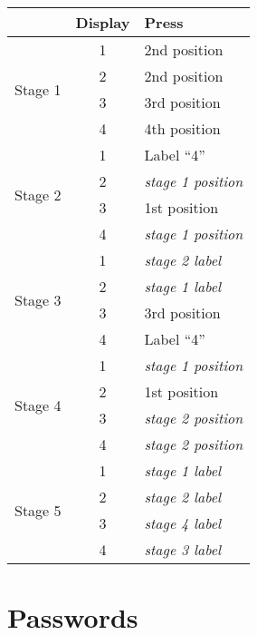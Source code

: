 \documentclass[11pt]{amsart}
\begin{document}
\begin{tabular}{|l|c|l|}
\hline
 & Display & Press \\
\hline
\multirow{4}{*}{Stage 1} & 1 & 2nd position \\
                         & 2 & 2nd position \\
                         & 3 & 3rd position \\
                         & 4 & 4th position \\
\hline
\multirow{4}{*}{Stage 2} & 1 & Label ``4'' \\
                         & 2 & \textit{stage 1 position} \\
                         & 3 & 1st position \\
                         & 4 & \textit{stage 1 position} \\
\hline
\multirow{4}{*}{Stage 3} & 1 & \textit{stage 2 label} \\
                         & 2 & \textit{stage 1 label} \\
                         & 3 & 3rd position \\
                         & 4 & Label ``4'' \\
\hline
\multirow{4}{*}{Stage 4} & 1 & \textit{stage 1 position} \\
                         & 2 & 1st position \\
                         & 3 & \textit{stage 2 position} \\
                         & 4 & \textit{stage 2 position} \\
\hline
\multirow{4}{*}{Stage 5} & 1 & \textit{stage 1 label} \\
                         & 2 & \textit{stage 2 label} \\
                         & 3 & \textit{stage 4 label} \\
                         & 4 & \textit{stage 3 label} \\
\hline
\end{tabular}




\section{Passwords}
\end{document}
